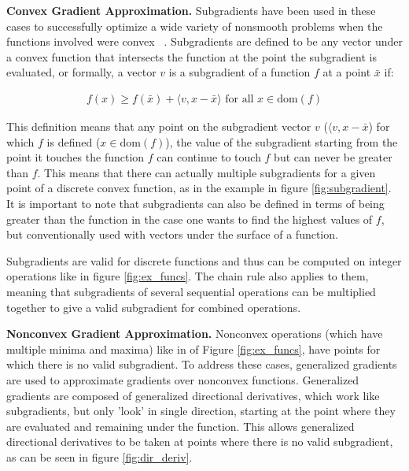 \noindent \textbf{Convex Gradient Approximation.} Subgradients have been used in these cases to successfully optimize a wide variety of nonsmooth problems when the functions involved were convex ~\cite{beck2017first}. Subgradients are defined to be any vector under a convex function that intersects the function at the point the subgradient is evaluated, or formally, a vector $v$ is a subgradient of a function $f$ at a point $\bar{x}$ if:

\vspace{-10pt}\begin{align}
  f\left(x\right) \geq f\left(\bar{x}\right) + \langle v, x-\bar{x} \rangle \textrm{ for all } x \in \textrm{dom}\left(f\right)
\end{align}

This definition means that any point on the subgradient vector $v$ ($\langle v, x-\bar{x}$) for which $f$ is defined ($x \in \textrm{dom}\left(f\right)$), the value of the subgradient starting from the point it touches the function $f$ can continue to touch $f$ but can never be greater than $f$. This means that there can actually multiple subgradients for a given point of a discrete convex function, as in the example in figure \ref{fig:subgradient}. It is important to note that subgradients can also be defined in terms of being greater than the function in the case one wants to find the highest values of $f$, but conventionally used with vectors under the surface of a function. 

Subgradients are valid for discrete functions and thus can be computed on integer operations like  in figure \ref{fig:ex_funcs}. The chain rule also applies to them, meaning that subgradients of several sequential operations can be multiplied together to give a valid subgradient for combined operations.

\noindent \textbf{Nonconvex Gradient Approximation.} Nonconvex operations (which have multiple minima and maxima) like  in  of Figure \ref{fig:ex_funcs}, have points for which there is no valid subgradient. To address these cases, generalized gradients are used to approximate gradients over nonconvex functions. Generalized gradients are composed of generalized directional derivatives, which work like subgradients, but only 'look' in single direction, starting at the point where they are evaluated and remaining under the function. This allows generalized directional derivatives to be taken at points where there is no valid subgradient, as can be seen in figure \ref{fig:dir_deriv}.



